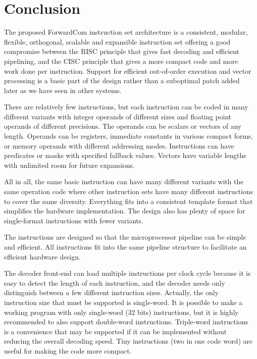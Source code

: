 \documentclass[forwardcom.tex]{subfiles}
\begin{document}
\RaggedRight

\chapter{Conclusion}
The proposed ForwardCom instruction set architecture is a consistent, modular, 
flexible, orthogonal, scalable and expansible instruction set offering a good compromise between the RISC principle that gives fast decoding and efficient pipelining, and the CISC principle that gives a more compact code and more work done per instruction. Support for efficient out-of-order execution and vector processing is a basic part of the design rather than a suboptimal patch added later as we have seen in other systems.
\vspace{2mm}

There are relatively few instructions, but each instruction can be coded in many different variants with integer operands of different sizes and floating point operands of different precisions. The operands can be scalars or vectors of any length. Operands can be registers, immediate constants in various compact forms, or memory operands with different addressing modes.  Instructions can have predicates or masks with specified fallback values. Vectors have variable lengths with unlimited room for future expansions.
\vspace{2mm}

All in all, the same basic instruction can have many different variants with the same operation code where other instruction sets have many different instructions to cover the same diversity. Everything fits into a consistent template format that simplifies the hardware implementation. The design also has plenty of space for single-format instructions with fewer variants. 
\vspace{2mm}

The instructions are designed so that the microprocessor pipeline can be simple and efficient. All instructions fit into the same pipeline structure to facilitate an efficient hardware design.
\vspace{2mm}

The decoder front-end can load multiple instructions per clock cycle because it is easy to detect the length of each instruction, and the decoder needs only distinguish between a few different instruction sizes. Actually, the only instruction size that must be supported is single-word. It is 
possible to make a working program with only single-word (32 bits) instructions, but it is highly recommended to also support double-word instructions. Triple-word instructions is a convenience that may be supported if it can be implemented without reducing the overall decoding speed. Tiny instructions (two in one code word) are useful for making the code more compact. 
\vspace{2mm}
\end{document}
